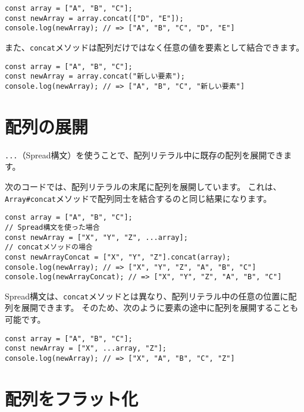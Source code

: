 \begin{lstlisting}
const array = ["A", "B", "C"];
const newArray = array.concat(["D", "E"]);
console.log(newArray); // => ["A", "B", "C", "D", "E"]
\end{lstlisting}

また、\texttt{concat}メソッドは配列だけではなく任意の値を要素として結合できます。

\begin{lstlisting}
const array = ["A", "B", "C"];
const newArray = array.concat("新しい要素");
console.log(newArray); // => ["A", "B", "C", "新しい要素"]
\end{lstlisting}

\hypertarget{spread}{%
\section[配列の展開]{配列の展開\,\protect{}}\label{spread}}

\texttt{...}（Spread構文）を使うことで、配列リテラル中に既存の配列を展開できます。

次のコードでは、配列リテラルの末尾に配列を展開しています。
これは、\texttt{Array\#concat}メソッドで配列同士を結合するのと同じ結果になります。

\begin{lstlisting}
const array = ["A", "B", "C"];
// Spread構文を使った場合
const newArray = ["X", "Y", "Z", ...array];
// concatメソッドの場合
const newArrayConcat = ["X", "Y", "Z"].concat(array);
console.log(newArray); // => ["X", "Y", "Z", "A", "B", "C"]
console.log(newArrayConcat); // => ["X", "Y", "Z", "A", "B", "C"]
\end{lstlisting}

Spread構文は、\texttt{concat}メソッドとは異なり、配列リテラル中の任意の位置に配列を展開できます。
そのため、次のように要素の途中に配列を展開することも可能です。

\begin{lstlisting}
const array = ["A", "B", "C"];
const newArray = ["X", ...array, "Z"];
console.log(newArray); // => ["X", "A", "B", "C", "Z"]
\end{lstlisting}

\hypertarget{flat}{%
\section[配列をフラット化]{配列をフラット化\,\protect{}}\label{flat}}


